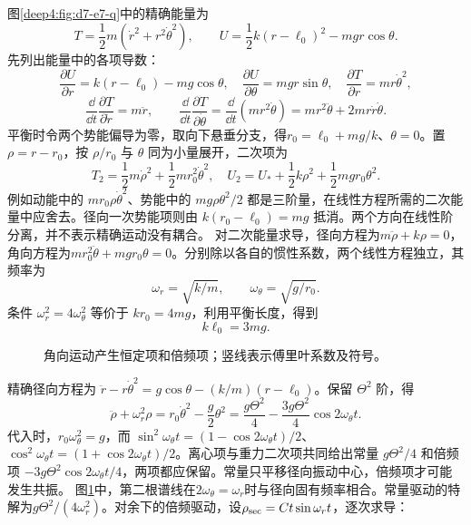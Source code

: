 \begin{solution}
图\ref{deep4:fig:d7-e7-q}中的精确能量为
\[
T=\frac12m(\dot r^2+r^2\dot\theta^2),\qquad
U=\frac12k(r-\ell_0)^2-mgr\cos\theta.
\]
先列出能量中的各项导数：
\[
\frac{\partial U}{\partial r}=k(r-\ell_0)-mg\cos\theta,
\quad\frac{\partial U}{\partial\theta}=mgr\sin\theta,
\quad\frac{\partial T}{\partial r}=mr\dot\theta^2,
\]
\[
\frac{\dd}{\dd t}\frac{\partial T}{\partial\dot r}=m\ddot r,
\qquad
\frac{\dd}{\dd t}\frac{\partial T}{\partial\dot\theta}
=\frac{\dd}{\dd t}(mr^2\dot\theta)
=mr^2\ddot\theta+2mr\dot r\dot\theta.
\]
平衡时令两个势能偏导为零，取向下悬垂分支，得$r_0=\ell_0+mg/k$、$\theta=0$。置 $\rho=r-r_0$，按 $\rho/r_0$ 与 $\theta$ 同为小量展开，二次项为
\[
T_2=\frac12m\dot\rho^2+\frac12mr_0^2\dot\theta^2,
\quad U_2=U_*+\frac12k\rho^2+\frac12mgr_0\theta^2.
\]
例如动能中的 $mr_0\rho\dot\theta^2$、势能中的 $mg\rho\theta^2/2$ 都是三阶量，在线性方程所需的二次能量中应舍去。径向一次势能项则由 $k(r_0-\ell_0)=mg$ 抵消。两个方向在线性阶分离，并不表示精确运动没有耦合。
对二次能量求导，径向方程为$m\ddot\rho+k\rho=0$，角向方程为$mr_0^2\ddot\theta+mgr_0\theta=0$。分别除以各自的惯性系数，两个线性方程独立，其频率为
\[
\boxed{\omega_r=\sqrt{k/m},\qquad \omega_\theta=\sqrt{g/r_0}.}
\]
条件 $\omega_r^2=4\omega_\theta^2$ 等价于 $kr_0=4mg$，利用平衡长度，得到
\[
\boxed{k\ell_0=3mg.}
\]
\begin{figure}[H]\centering
{}
\caption{角向运动产生恒定项和倍频项；竖线表示傅里叶系数及符号。}\label{deep4:fig:d7-e7-s}
\end{figure}
精确径向方程为 $\ddot r-r\dot\theta^2=g\cos\theta-(k/m)(r-\ell_0)$。保留 $\Theta^2$ 阶，得
\[
\ddot\rho+\omega_r^2\rho
=r_0\dot\theta^2-\frac g2\theta^2
=\frac{g\Theta^2}{4}-\frac{3g\Theta^2}{4}\cos2\omega_\theta t.
\]
代入时，$r_0\omega_\theta^2=g$，而 $\sin^2\omega_\theta t=(1-\cos2\omega_\theta t)/2$、$\cos^2\omega_\theta t=(1+\cos2\omega_\theta t)/2$。离心项与重力二次项共同给出常量 $g\Theta^2/4$ 和倍频项 $-3g\Theta^2\cos2\omega_\theta t/4$，两项都应保留。常量只平移径向振动中心，倍频项才可能发生共振。
图\ref{deep4:fig:d7-e7-s}中，第二根谱线在$2\omega_\theta=\omega_r$时与径向固有频率相合。常量驱动的特解为$g\Theta^2/(4\omega_r^2)$。对余下的倍频驱动，设$\rho_{\rm sec}=Ct\sin\omega_rt$，逐次求导：

\end{solution}

